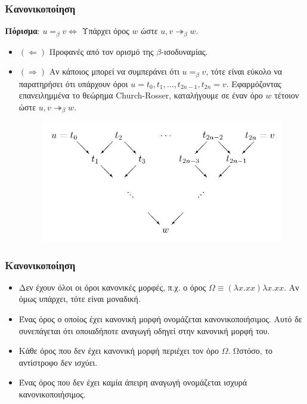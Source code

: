 \documentclass{beamer}
\begin{document}
\begin{frame}
  \frametitle{Κανονικοποίηση}
  \textbf{Πόρισμα}: $u =_\beta v \Leftrightarrow$ Υπάρχει όρος $w$
  ώστε $u, v \twoheadrightarrow _\beta w$.
  \begin{itemize}
  \item $(\Leftarrow)$ Προφανές από τον ορισμό της $\beta$-ισοδυναμίας.
  \item $(\Rightarrow)$ Aν κάποιος μπορεί να συμπεράνει ότι $u =_\beta v$,
    τότε είναι εύκολο να παρατηρήσει ότι υπάρχουν όροι $u = t_0,
    t_1,\ldots, t_{2n-1}, t_{2n} = v$. Εφαρμόζοντας επανειλημμένα το
    θεώρημα Church-Rosser, καταλήγουμε σε έναν όρο $w$ τέτοιον ώστε
    $u, v \twoheadrightarrow _\beta w$.
    \begin{figure} [!ht]
      \centering
      \includegraphics[scale=0.3] {CR1.jpg}
    \end{figure}
  \end{itemize}
\end{frame}

\begin{frame}
  \frametitle{Κανονικοποίηση}
  \begin{itemize}
  \item Δεν έχουν όλοι οι όροι κανονικές μορφές, π.χ. ο όρος $\Omega
    \equiv (\lambda x . xx) \lambda x . xx$. Αν όμως υπάρχει, τότε
    είναι μοναδική.
  \item Ένας όρος ο οποίος έχει κανονική μορφή ονομάζεται
    κανονικοποιήσιμος. Αυτό δε συνεπάγεται ότι οποιαδήποτε αναγωγή
    οδηγεί στην κανονική μορφή του.
  \item Κάθε όρος που δεν έχει κανονική μορφή περιέχει τον όρο
    $\Omega$. Ωστόσο, το αντίστροφο δεν ισχύει.
  \item Ένας όρος που δεν έχει καμία άπειρη αναγωγή ονομάζεται ισχυρά
    κανονικοποιήσιμος.
  \end{itemize}
\end{frame}
\end{document}
